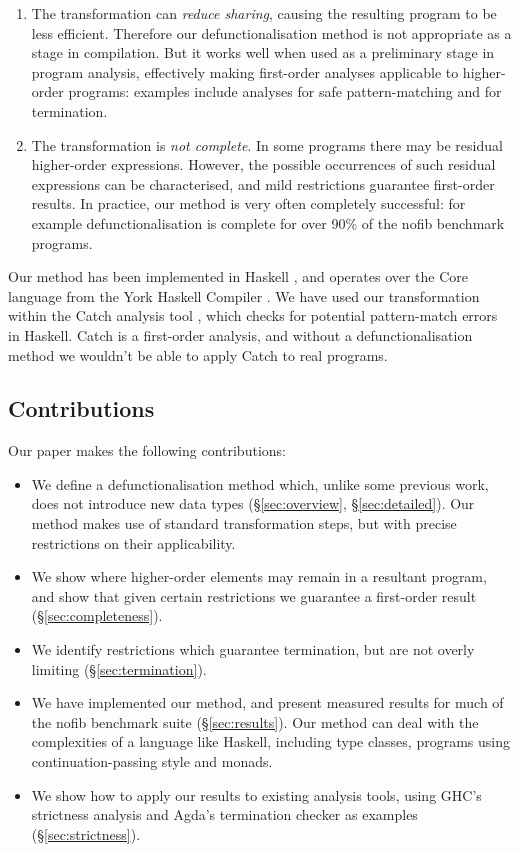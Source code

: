 \documentclass{sigplanconf}
\begin{document}
\begin{enumerate}
\item The transformation can \textit{reduce sharing}, causing the resulting program to be less efficient.  Therefore our defunctionalisation method is not appropriate as a  stage in compilation.  But it works well when used as a preliminary stage in program analysis, effectively making first-order analyses applicable to higher-order programs: examples include analyses for safe pattern-matching and for termination.
\item The transformation is \textit{not complete}.  In some programs there may be residual higher-order expressions.  However, the possible occurrences of such residual expressions can be characterised, and mild restrictions guarantee first-order results.  In practice, our method is very often completely successful: for example defunctionalisation is complete for over 90\% of the nofib benchmark programs.
\end{enumerate}

\negsmallskip

Our method has been implemented in Haskell \cite{haskell}, and operates over the Core language from the York Haskell Compiler \cite{me:yhc_core}. We have used our transformation within the Catch analysis tool \cite{me:catch}, which checks for potential pattern-match errors in Haskell. Catch is a first-order analysis, and without a defunctionalisation method we wouldn't be able to apply Catch to real programs.

\subsection{Contributions}

Our paper makes the following contributions:

\begin{itemize}
\item We define a defunctionalisation method which, unlike some previous work, does not introduce new data types (\S\ref{sec:overview}, \S\ref{sec:detailed}). Our method makes use of standard transformation steps, but with precise restrictions on their applicability.
\item We show where higher-order elements may remain in a resultant program, and show that given certain restrictions we guarantee a first-order result (\S\ref{sec:completeness}).
\item We identify restrictions which guarantee termination, but are not overly limiting (\S\ref{sec:termination}).
\item We have implemented our method, and present measured results for much of the nofib benchmark suite (\S\ref{sec:results}). Our method can deal with the complexities of a language like Haskell, including type classes, programs using continuation-passing style and monads.
\item We show how to apply our results to existing analysis tools, using GHC's strictness analysis and Agda's termination checker as examples (\S\ref{sec:strictness}).
\end{itemize}
\end{document}
